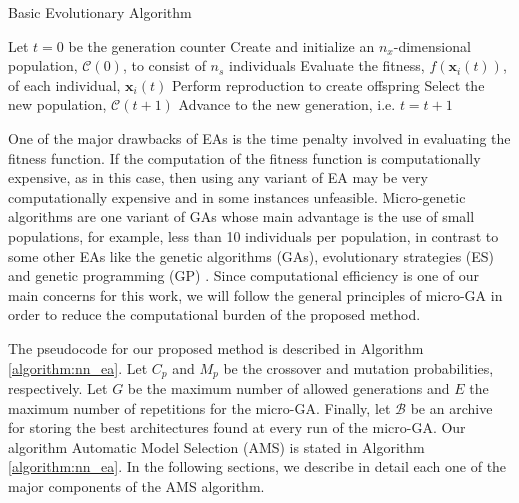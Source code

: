 \documentclass[12pt]{elsart}%
\begin{document}
\begin{algorithm}[!htb]
\caption{Basic Evolutionary Algorithm}
\begin{algorithmic}
\State Let $t = 0$ be the generation counter
\State Create and initialize an $n_x$-dimensional population, $\mathcal{C}(0)$, to consist of $n_s$ individuals
	\State Evaluate the fitness, $f(\mathbf{x}_i(t))$, of each individual, $\mathbf{x}_i(t)$
	\State Perform reproduction to create offspring
	\State Select the new population, $\mathcal{C}(t+1)$
	\State Advance to the new generation, i.e. $t = t +1$
\EndWhile
\end{algorithmic}
\label{algorithm:generic_ea}
\end{algorithm}

One of the major drawbacks of EAs is the time penalty involved in evaluating the fitness function. If the computation of the fitness function is computationally expensive, as in this case, then using any variant of EA may be very computationally expensive and in some instances unfeasible. Micro-genetic algorithms \cite{Krishnakumar1989} are one variant of GAs whose main advantage is the use of small populations, for example, less than 10 individuals per population, in contrast to some other EAs like the genetic algorithms (GAs), evolutionary strategies (ES) and genetic programming (GP) \cite{Engelbrecht2007}. Since computational efficiency is one of our main concerns for this work, we will follow the general principles of micro-GA in order to reduce the computational burden of the proposed method. 

The pseudocode for our proposed method is described in Algorithm \ref{algorithm:nn_ea}. Let $C_p$ and $M_p$ be the crossover and mutation probabilities, respectively. Let $G$ be the maximum number of allowed generations and $E$ the maximum number of repetitions for the micro-GA. Finally, let $\mathcal{B}$ be an archive for storing the best architectures found at every run of the micro-GA. Our algorithm Automatic Model Selection (AMS) is stated in Algorithm \ref{algorithm:nn_ea}. In the following sections, we describe in detail each one of the major components of the AMS algorithm.
\end{document}
